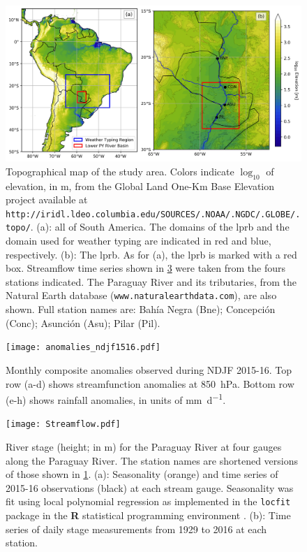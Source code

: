 \documentclass[twocol]{ametsoc}
\begin{document}
\begin{figure}
	\noindent\includegraphics[width=6.5in]{study_area.jpg}
	\caption{
		Topographical map of the study area.
		Colors indicate $\log_{10}$ of elevation, in \si{\meter}, from the Global Land One-Km Base Elevation project available at \texttt{http://iridl.ldeo.columbia.edu/SOURCES/.NOAA/.NGDC/.GLOBE/.topo/}.
		(a): all of South America.
		The domains of the \acrlong{lprb} and the domain used for weather typing are indicated in red and blue, respectively.
		(b): The \acrfull{lprb}.
		As for (a), the \gls{lprb} is marked with a red box.
		Streamflow time series shown in \cref{fig:streamflow} were taken from the fours stations indicated.
		The Paraguay River and its tributaries, from the Natural Earth database (\texttt{www.naturalearthdata.com}), are also shown.
		Full station names are: Bah\'ia Negra (Bne); Concepci\'on (Conc); Asunci\'on (Asu); Pilar (Pil).
	}\label{fig:study-area}
\end{figure}

\begin{figure}
	\noindent\texttt{[image: anomalies\_ndjf1516.pdf]}
	\caption{
		Monthly composite anomalies observed during NDJF 2015-16.
		Top row (a-d) shows streamfunction anomalies at \SI{850}{\hecto\pascal}.
		Bottom row (e-h) shows rainfall anomalies, in units of \si{\milli\meter\per\day}.
	}\label{fig:anomalies}
\end{figure}

\begin{figure}
	\noindent\texttt{[image: Streamflow.pdf]}
	\caption{
		River stage (height; in \si{\meter}) for the Paraguay River at four gauges along the Paraguay River.
		The station names are shortened versions of those shown in \cref{fig:study-area}.
		(a): Seasonality (orange) and time series of 2015-16 observations (black) at each stream gauge.
		Seasonality was fit using local polynomial regression as implemented in the \texttt{locfit} package in the \textbf{R} statistical programming environment \citep{Loader1999}.
		(b): Time series of daily stage measurements from 1929 to 2016 at each station.
	}\label{fig:streamflow}
\end{figure}
\end{document}
